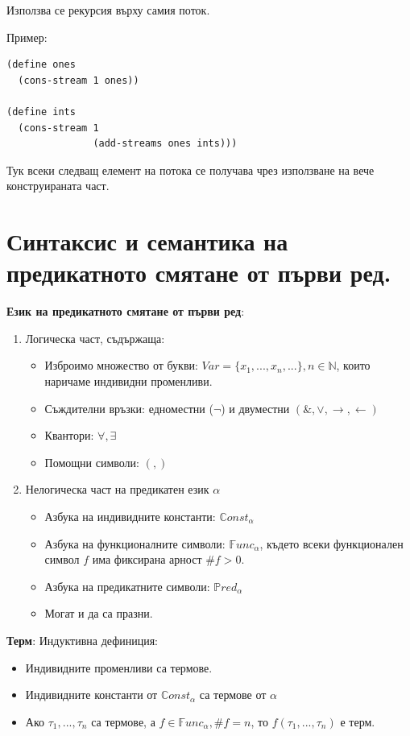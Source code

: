 \documentclass{article}
\renewcommand{\\}{\newline}
\begin{document}
Използва се рекурсия върху самия поток.

Пример:
\begin{lstlisting}
(define ones
  (cons-stream 1 ones))

(define ints
  (cons-stream 1
               (add-streams ones ints)))
\end{lstlisting}

Тук всеки следващ елемент на потока се получава чрез използване на вече конструираната част.
\newpage
\section{Синтаксис и семантика на предикатното смятане от първи ред.}


\textbf{Език на предикатното смятане от първи ред}: \begin{enumerate}
    \item Логическа част, съдържаща: \begin{itemize}
      \item Изброимо множество от букви: \(Var = \{x_1,...,x_n, ...\}, n \in \mathbb{N}\), които наричаме индивидни променливи.
        \item Съждителни връзки: едноместни (\(\lnot\)) и двуместни \((\&, \lor, \rightarrow, \leftarrow )\)  
        \item Квантори: \(\forall, \exists\)
        \item Помощни символи: \(\left(, \right)\)  
    \end{itemize}

  \item Нелогическа част на предикатен език \(\alpha\) \begin{itemize}
      \item Азбука на индивидните константи: \(\mathbb{C}onst_{\alpha}\)
      \item Азбука на функционалните символи: \(\mathbb{F}unc_{\alpha}\), където всеки функционален символ \(f\) има фиксирана арност \(\#f > 0\).     
      \item Азбука на предикатните символи: \(\mathbb{P}red_{\alpha}\) 
      \item Могат и да са празни.
  \end{itemize} 

\end{enumerate}

\textbf{Терм}: Индуктивна дефиниция:
\begin{itemize}
    \item Индивидните променливи са термове.
    \item Индивидните константи от \(\mathbb{C}onst_{\alpha}\) са термове от \(\alpha\) 
    \item Ако \(\tau_1, ..., \tau_n\) са термове, а \(f \in \mathbb{F}unc_{\alpha}, \#f=n\), то \(f(\tau_1, ..., \tau_n)\) е терм.   
\end{itemize}
\end{document}
